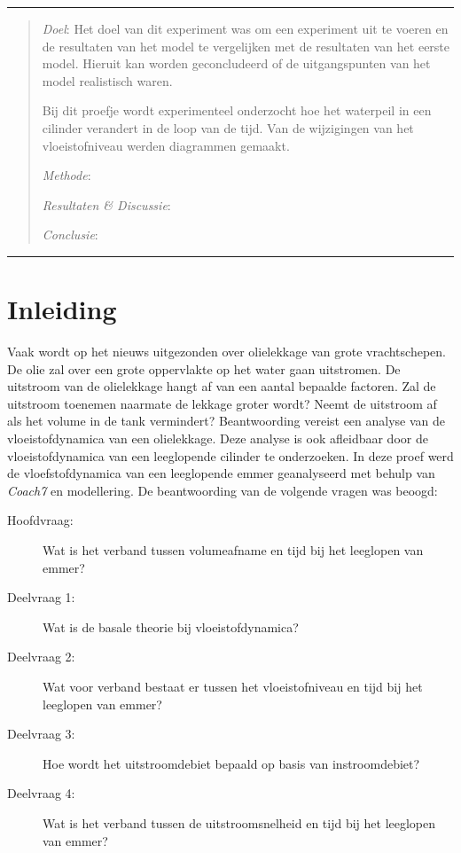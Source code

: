 \documentclass[numbers=endperiod]{scrartcl}
\begin{document}

\hrule
\begin{abstract}
    \textit{Doel}: Het doel van dit experiment was om een experiment uit te voeren en de resultaten van het model te vergelijken met de resultaten van het eerste model. Hieruit kan worden geconcludeerd of de uitgangspunten van het model realistisch waren.
    
    Bij dit proefje wordt experimenteel onderzocht hoe het waterpeil in een cilinder verandert in de loop van de tijd. Van de wijzigingen van het vloeistofniveau werden diagrammen gemaakt.  

    \textit{Methode}:

    \textit{Resultaten \& Discussie}:

    \textit{Conclusie}:
\end{abstract}
\hrule


\newpage
\tableofcontents


\newpage
\section{Inleiding}
Vaak wordt op het nieuws uitgezonden over olielekkage van grote vrachtschepen. De olie zal over een grote oppervlakte op het water gaan uitstromen. De uitstroom van de olielekkage hangt af van een aantal bepaalde factoren. Zal de uitstroom toenemen naarmate de lekkage groter wordt? Neemt de uitstroom af als het volume in de tank vermindert? Beantwoording vereist een analyse van de vloeistofdynamica van een olielekkage. Deze analyse is ook afleidbaar door de vloeistofdynamica van een leeglopende cilinder te onderzoeken. In deze proef werd de vloefstofdynamica van een leeglopende emmer geanalyseerd met behulp van \textit{Coach7} en modellering. De beantwoording van de volgende vragen was beoogd:

\begin{description}
\item[Hoofdvraag:] Wat is het verband tussen volumeafname en tijd bij het leeglopen van emmer?

\item[Deelvraag 1:] Wat is de basale theorie bij vloeistofdynamica?

\item[Deelvraag 2:] Wat voor verband bestaat er tussen het vloeistofniveau en tijd bij het leeglopen van emmer?

\item[Deelvraag 3:] Hoe wordt het uitstroomdebiet bepaald op basis van instroomdebiet?

\item[Deelvraag 4:] Wat is het verband tussen de uitstroomsnelheid en tijd bij het leeglopen van emmer?
\end{description}
\end{document}
